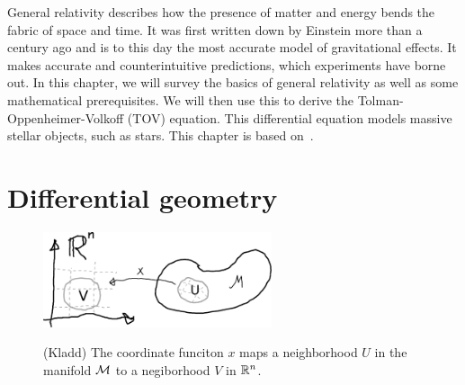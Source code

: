 General relativity describes how the presence of matter and energy bends the fabric of space and time.
It was first written down by Einstein more than a century ago and is to this day the most accurate model of gravitational effects.
It makes accurate and counterintuitive predictions, which experiments have borne out.
In this chapter, we will survey the basics of general relativity as well as some mathematical prerequisites.
We will then use this to derive the Tolman-Oppenheimer-Volkoff (TOV) equation.
This differential equation models massive stellar objects, such as stars. 
This chapter is based on~\autocite{carrollSpacetimeGeometryIntroduction2019,leeSmoothManifolds2012}.

\section{Differential geometry}

\begin{figure}[ht]
    \centering
    \includegraphics[width=0.6\textwidth]{figurer/coordinate_function.pdf}
    \label{coordinate function}
    \caption{(Kladd) The coordinate funciton $x$ maps a neighborhood $U$ in the manifold $\mathcal{M}$ to a negiborhood $V$ in $\mathbb{R}^n$.}
\end{figure}


